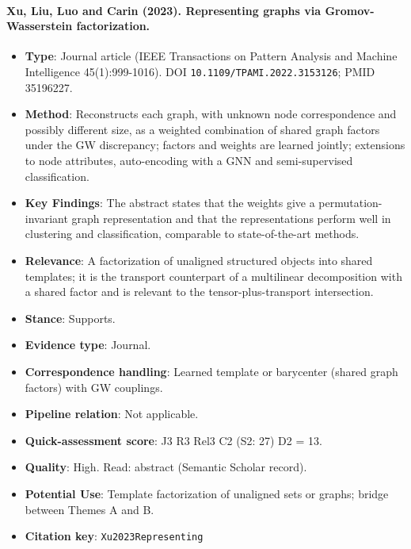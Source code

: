\documentclass[journal,onecolumn]{IEEEtran}
\begin{document}
\paragraph{Xu, Liu, Luo and Carin (2023). Representing graphs via Gromov-Wasserstein factorization.~\cite{Xu2023Representing}}\mbox{}

\begin{itemize}

\item{} \textbf{Type}: Journal article (IEEE Transactions on Pattern Analysis and Machine Intelligence 45(1):999-1016). DOI \nolinkurl{10.1109/TPAMI.2022.3153126}; PMID 35196227.

\item{} \textbf{Method}: Reconstructs each graph, with unknown node correspondence and possibly different size, as a weighted combination of shared graph factors under the GW discrepancy; factors and weights are learned jointly; extensions to node attributes, auto-encoding with a GNN and semi-supervised classification.

\item{} \textbf{Key Findings}: The abstract states that the weights give a permutation-invariant graph representation and that the representations perform well in clustering and classification, comparable to state-of-the-art methods.

\item{} \textbf{Relevance}: A factorization of unaligned structured objects into shared templates; it is the transport counterpart of a multilinear decomposition with a shared factor and is relevant to the tensor-plus-transport intersection.

\item{} \textbf{Stance}: Supports.

\item{} \textbf{Evidence type}: Journal.

\item{} \textbf{Correspondence handling}: Learned template or barycenter (shared graph factors) with GW couplings.

\item{} \textbf{Pipeline relation}: Not applicable.

\item{} \textbf{Quick-assessment score}: J3 R3 Rel3 C2 (S2: 27) D2 = 13.

\item{} \textbf{Quality}: High. Read: abstract (Semantic Scholar record).

\item{} \textbf{Potential Use}: Template factorization of unaligned sets or graphs; bridge between Themes A and B.

\item{} \textbf{Citation key}: \texttt{Xu2023Representing}

\end{itemize}
\end{document}

